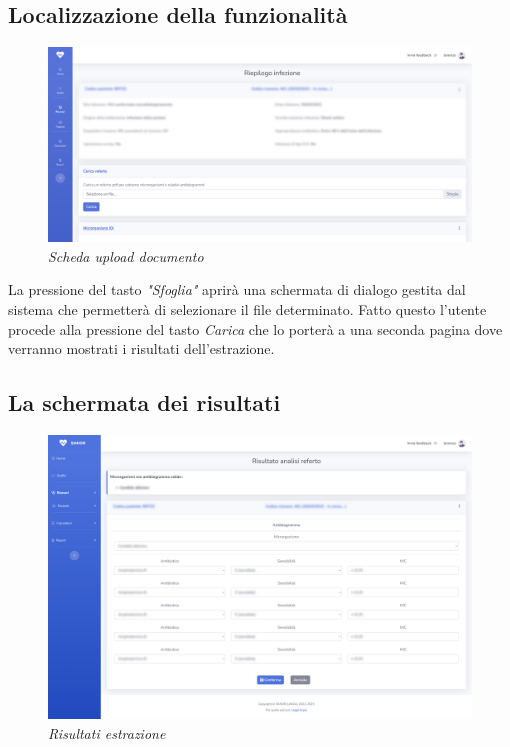 \subsection{Localizzazione della funzionalità}
\begin{figure}[h!]
	\centering
	\includegraphics[width=.99\columnwidth]{images/feature_location.png}
	\caption{\textit{Scheda upload documento}}
	\label{fig:feature_location}
\end{figure}

La pressione del tasto \textit{"Sfoglia"} aprirà una schermata di dialogo gestita dal sistema che permetterà di selezionare il file determinato. Fatto questo l'utente procede alla pressione del tasto \textit{Carica} che lo porterà a una seconda pagina dove verranno mostrati i risultati dell'estrazione.
\subsection{La schermata dei risultati}

\begin{figure}[h!]
	\centering
	\includegraphics[width=.99\columnwidth]{images/extraction_result.png}
	\caption{\textit{Risultati estrazione}}
	\label{fig:extraction_result}
\end{figure}

